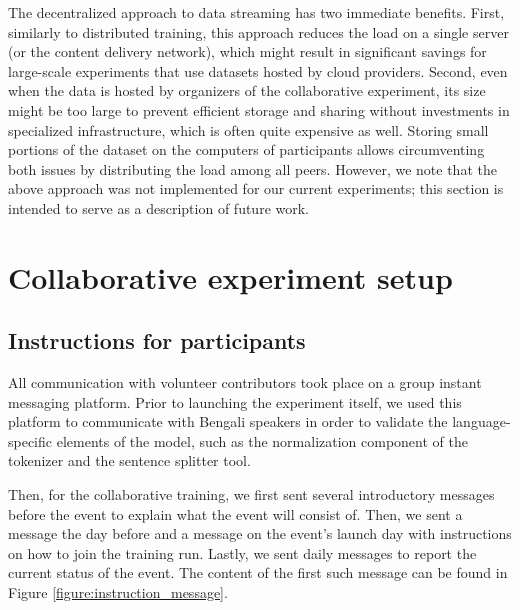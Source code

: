 The decentralized approach to data streaming has two immediate benefits. First, similarly to distributed training, this approach reduces the load on a single server (or the content delivery network), which might result in significant savings for large-scale experiments that use datasets hosted by cloud providers. Second, even when the data is hosted by organizers of the collaborative experiment, its size might be too large to prevent efficient storage and sharing without investments in specialized infrastructure, which is often quite expensive as well. Storing small portions of the dataset on the computers of participants allows circumventing both issues by distributing the load among all peers.
However, we note that the above approach was not implemented for our current experiments; this section is intended to serve as a description of future work.

\section{Collaborative experiment setup}

\subsection{Instructions for participants}
\label{appendix:volunteer_instruction}
All communication with volunteer contributors took place on a group instant messaging platform. Prior to launching the experiment itself, we used this platform to communicate with Bengali speakers in order to validate the language-specific elements of the model, such as the normalization component of the tokenizer and the sentence splitter tool.

Then, for the collaborative training, we first sent several introductory messages before the event to explain what the event will consist of. Then, we sent a message the day before and a message on the event's launch day with instructions on how to join the training run. Lastly, we sent daily messages to report the current status of the event. The content of the first such message can be found in Figure \ref{figure:instruction_message}. 

